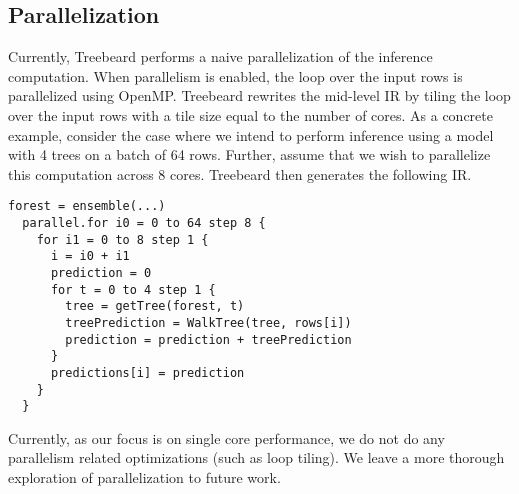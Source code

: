 
\subsection{Parallelization}
Currently, Treebeard performs a naive parallelization of the inference computation. When parallelism is enabled, the 
loop over the input rows is parallelized using OpenMP. Treebeard rewrites 
the mid-level IR by tiling the loop over the input rows with a tile size equal to the number of cores. 
As a concrete example, consider the case where we intend to perform inference using a model with 4 trees 
on a batch of 64 rows. Further, assume that we wish to parallelize this computation across 8 cores. 
Treebeard then generates the following IR.
\begin{lstlisting}[style=c++]
  forest = ensemble(...)
  parallel.for i0 = 0 to 64 step 8 {
    for i1 = 0 to 8 step 1 {
      i = i0 + i1
      prediction = 0
      for t = 0 to 4 step 1 {
        tree = getTree(forest, t) 
        treePrediction = WalkTree(tree, rows[i])
        prediction = prediction + treePrediction
      }
      predictions[i] = prediction
    }
  }
\end{lstlisting}
Currently, as our focus is on single core performance, we do not 
do any parallelism related optimizations (such as loop tiling). We leave a more thorough exploration of parallelization 
to future work.